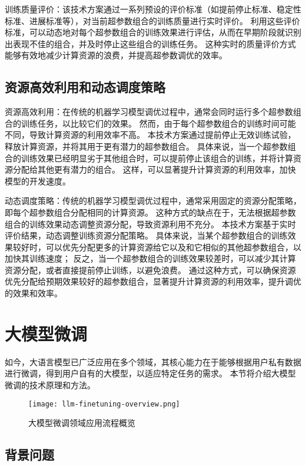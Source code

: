 训练质量评价：该技术方案通过一系列预设的评价标准（如提前停止标准、稳定性标准、进展标准等），对当前超参数组合的训练质量进行实时评价。
利用这些评价标准，可以动态地对每个超参数组合的训练效果进行评估，从而在早期阶段就识别出表现不佳的组合，并及时停止这些组合的训练任务。
这种实时的质量评价方式能够有效地减少计算资源的浪费，并提高超参数调优的效率。

\subsection{资源高效利用和动态调度策略}

资源高效利用：在传统的机器学习模型调优过程中，通常会同时运行多个超参数组合的训练任务，以比较它们的效果。
然而，由于每个超参数组合的训练时间可能不同，导致计算资源的利用效率不高。
本技术方案通过提前停止无效训练试验，释放计算资源，并将其用于更有潜力的超参数组合。
具体来说，当一个超参数组合的训练效果已经明显劣于其他组合时，可以提前停止该组合的训练，并将计算资源分配给其他更有潜力的组合。
这样，可以显著提升计算资源的利用效率，加快模型的开发速度。

动态调度策略：传统的机器学习模型调优过程中，通常采用固定的资源分配策略，即每个超参数组合分配相同的计算资源。
这种方式的缺点在于，无法根据超参数组合的训练效果动态调整资源分配，导致资源利用不充分。
本技术方案基于实时评价结果，动态调整训练资源分配策略。
具体来说，当某个超参数组合的训练效果较好时，可以优先分配更多的计算资源给它以及和它相似的其他超参数组合，以加快其训练速度；
反之，当一个超参数组合的训练效果较差时，可以减少其计算资源分配，或者直接提前停止训练，以避免浪费。
通过这种方式，可以确保资源优先分配给预期效果较好的超参数组合，显著提升计算资源的利用效率，提升调优的效果和效率。


\section{大模型微调}

如今，大语言模型已广泛应用在多个领域，其核心能力在于能够根据用户私有数据进行微调，得到用户自有的大模型，以适应特定任务的需求。
本节将介绍大模型微调的技术原理和方法。

\begin{figure}
  \centering
  \texttt{[image: llm-finetuning-overview.png]}
  \caption{大模型微调领域应用流程概览}
  \label{fig:finetuning}
\end{figure}

\subsection{背景问题}

